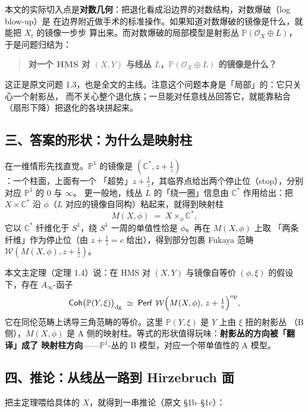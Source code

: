 本文的实际切入点是\textbf{对数几何}：把退化看成沿边界的对数结构，对数爆破（log blow-up）是
在边界附近做手术的标准操作。如果知道对数爆破的镜像是什么，就能把 $X_t$ 的镜像一步步
算出来。而对数爆破的局部模型是射影丛 $\mathbb{P}(\mathcal{O}_X\oplus L)$，于是问题归结为：

\begin{quote}
\bfseries 对一个 HMS 对 $(X,Y)$ 与线丛 $L$，$\mathbb{P}(\mathcal{O}_X\oplus L)$ 的镜像是什么？
\end{quote}

这正是原文问题 1.3，也是全文的主线。注意这个问题本身是「局部」的：它只关心一个射影丛，
而不关心整个退化族；一旦能对任意线丛回答它，就能靠粘合（扇形下降）把退化的各块拼起来。

\subsection*{三、答案的形状：为什么是映射柱}

在一维情形先找直觉。$\mathbb{P}^1$ 的镜像是 $(\mathbb{C}^*,z+\frac1z)$：一个柱面，上面有一个
「超势」$z+\frac1z$，其临界点给出两个停止位（stop），分别对应 $\mathbb{P}^1$ 的 $0$ 与 $\infty$。
更一般地，线丛 $L$ 的「绕一圈」信息由 $\mathbb{C}^*$ 作用给出：把 $X\times\mathbb{C}^*$ 沿
$\phi$（$L$ 对应的镜像自同构）粘起来，就得到映射柱
\[
  M(X,\phi)\;=\;X\times_\phi\mathbb{C}^*,
\]
它以 $\mathbb{C}^*$ 纤维化于 $S^1$，绕 $S^1$ 一周的单值性恰是 $\phi$。再在 $M(X,\phi)$ 上取
「两条纤维」作为停止位（由 $z+\frac1z=c$ 给出），得到部分包裹 Fukaya 范畴
$\mathcal{W}(M(X,\phi),z+\frac1z)$。

本文主定理（定理 1.4）说：在 HMS 对 $(X,Y)$ 与镜像自等价 $(\phi,\xi)$ 的假设下，存在
$A_\infty$-函子
\[
  \operatorname{\mathsf{Coh}}\bigl(\mathbb{P}(Y,\xi)\bigr)_{\mathrm{dg}}
  \;\simeq\;
  \operatorname{\mathsf{Perf}}\,\mathcal{W}\Bigl(M(X,\phi),\,z+\tfrac1z\Bigr)^{\mathrm{op}},
\]
它在同伦范畴上诱导三角范畴的等价。这里 $\mathbb{P}(Y,\xi)$ 是 $Y$ 上由 $\xi$ 扭的射影丛
（B 侧），$M(X,\phi)$ 是 A 侧的映射柱。等式的形状值得玩味：\textbf{射影丛的方向被「翻译」成了
映射柱方向}——$\mathbb{P}^1$-丛的 B 模型，对应一个带单值性的 A 模型。

\subsection*{四、推论：从线丛一路到 Hirzebruch 面}

把主定理喂给具体的 $X$，就得到一串推论（原文 §1b–§1c）：

